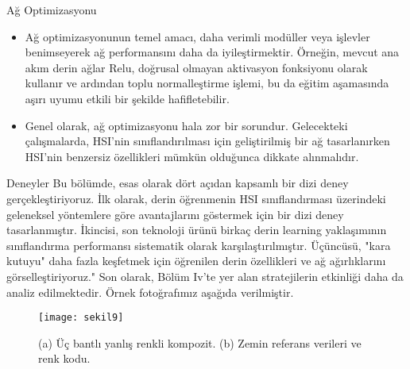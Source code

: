\documentclass{beamer}
\begin{document}
\begin{frame}{Ağ Optimizasyonu}
\begin{itemize}
  \item Ağ optimizasyonunun temel amacı, daha verimli modüller veya işlevler benimseyerek ağ performansını daha da iyileştirmektir. Örneğin, mevcut ana akım derin ağlar Relu, doğrusal olmayan aktivasyon fonksiyonu olarak kullanır ve ardından toplu normalleştirme işlemi, bu da eğitim aşamasında aşırı uyumu etkili bir şekilde hafifletebilir.
  \item Genel olarak, ağ optimizasyonu hala zor bir sorundur. Gelecekteki çalışmalarda, HSI'nin sınıflandırılması için geliştirilmiş bir ağ tasarlanırken HSI'nin benzersiz özellikleri mümkün olduğunca dikkate alınmalıdır.
\end{itemize}
\end{frame}

\begin{frame}{Deneyler}
Bu bölümde, esas olarak dört açıdan kapsamlı bir dizi deney gerçekleştiriyoruz. İlk olarak, derin öğrenmenin HSI sınıflandırması üzerindeki geleneksel yöntemlere göre avantajlarını göstermek için bir dizi deney tasarlanmıştır. İkincisi, son teknoloji ürünü birkaç derin learning yaklaşımının sınıflandırma performansı sistematik olarak karşılaştırılmıştır. Üçüncüsü, "kara kutuyu" daha fazla keşfetmek için öğrenilen derin özellikleri ve ağ ağırlıklarını görselleştiriyoruz." Son olarak, Bölüm Iv'te yer alan stratejilerin etkinliği daha da analiz edilmektedir. Örnek fotoğrafımız aşağıda verilmiştir.
\end{frame}

\begin{frame}
  \begin{figure}[]
    \centering
    \texttt{[image: sekil9]}
    \label{fig:sekil5}
    \caption{(a) Üç bantlı yanlış renkli kompozit. (b) Zemin referans verileri ve renk kodu.} 
  \end{figure}
\end{frame}


\end{document}
